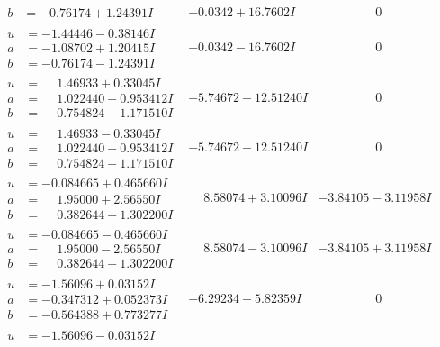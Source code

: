 \documentclass[1p]{elsarticle_modified}
\theoremstyle{definition}
\begin{document}
$$\begin{array}{c|c|c}
\begin{aligned}
b &= -0.76174 + 1.24391 I\end{aligned}
 & -0.0342 + 16.7602 I & \phantom{-0.000000 } 0 \\ \hline\begin{aligned}
u &= -1.44446 - 0.38146 I \\
a &= -1.08702 + 1.20415 I \\
b &= -0.76174 - 1.24391 I\end{aligned}
 & -0.0342 - 16.7602 I & \phantom{-0.000000 } 0 \\ \hline\begin{aligned}
u &= \phantom{-}1.46933 + 0.33045 I \\
a &= \phantom{-}1.022440 - 0.953412 I \\
b &= \phantom{-}0.754824 + 1.171510 I\end{aligned}
 & -5.74672 - 12.51240 I & \phantom{-0.000000 } 0 \\ \hline\begin{aligned}
u &= \phantom{-}1.46933 - 0.33045 I \\
a &= \phantom{-}1.022440 + 0.953412 I \\
b &= \phantom{-}0.754824 - 1.171510 I\end{aligned}
 & -5.74672 + 12.51240 I & \phantom{-0.000000 } 0 \\ \hline\begin{aligned}
u &= -0.084665 + 0.465660 I \\
a &= \phantom{-}1.95000 + 2.56550 I \\
b &= \phantom{-}0.382644 - 1.302200 I\end{aligned}
 & \phantom{-}8.58074 + 3.10096 I & -3.84105 - 3.11958 I \\ \hline\begin{aligned}
u &= -0.084665 - 0.465660 I \\
a &= \phantom{-}1.95000 - 2.56550 I \\
b &= \phantom{-}0.382644 + 1.302200 I\end{aligned}
 & \phantom{-}8.58074 - 3.10096 I & -3.84105 + 3.11958 I \\ \hline\begin{aligned}
u &= -1.56096 + 0.03152 I \\
a &= -0.347312 + 0.052373 I \\
b &= -0.564388 + 0.773277 I\end{aligned}
 & -6.29234 + 5.82359 I & \phantom{-0.000000 } 0 \\ \hline\begin{aligned}
u &= -1.56096 - 0.03152 I \\

\end{aligned}
\end{array}$$
\end{document}
